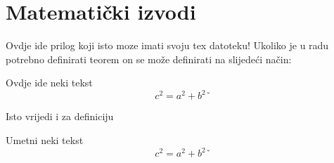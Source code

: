 \chapter{Matematički izvodi}
Ovdje ide prilog koji isto moze imati svoju tex datoteku!
Ukoliko je u radu potrebno definirati teorem on se može definirati na slijedeći način:
\begin{fmd-theorem}[Proba]
Ovdje ide neki tekst
\begin{equation}
c^2 = a^2+b^2ˇ
\end{equation}
\end{fmd-theorem}



Isto vrijedi i za definiciju
\begin{fmd-definition}[adf]
Umetni neki tekst
\begin{equation}
c^2 = a^2+b^2ˇ
\end{equation}
\end{fmd-definition}